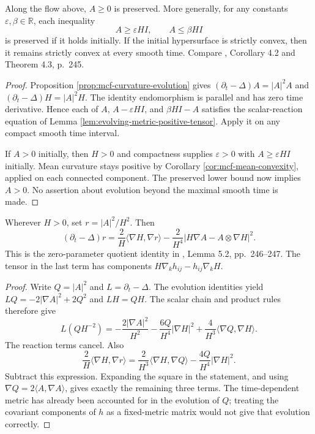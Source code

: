 \begin{proposition}\label{prop:mcf-linear-pinching}
Along the flow above, $A\geq0$ is preserved. More generally, for any constants $\varepsilon,\beta\in\mathbb R$, each inequality
\[
 A\geq\varepsilon H I,\qquad A\leq\beta H I
\]
is preserved if it holds initially. If the initial hypersurface is strictly convex, then it remains strictly convex at every smooth time. Compare \cite{Hui84}, Corollary 4.2 and Theorem 4.3, p.~245.
\end{proposition}
\begin{proof}
Proposition \ref{prop:mcf-curvature-evolution} gives
$(\partial_t-\Delta)A=|A|^2A$ and $(\partial_t-\Delta)H=|A|^2H$. The identity endomorphism is parallel and has zero time derivative. Hence each of $A$, $A-\varepsilon HI$, and $\beta HI-A$ satisfies the scalar-reaction equation of Lemma \ref{lem:evolving-metric-positive-tensor}. Apply it on any compact smooth time interval.

If $A>0$ initially, then $H>0$ and compactness supplies $\varepsilon>0$ with $A\geq\varepsilon HI$ initially. Mean curvature stays positive by Corollary \ref{cor:mcf-mean-convexity}, applied on each connected component. The preserved lower bound now implies $A>0$. No assertion about evolution beyond the maximal smooth time is made.
\end{proof}

\begin{proposition}\label{prop:mcf-curvature-ratio}
Wherever $H>0$, set $r=|A|^2/H^2$. Then
\[
 (\partial_t-\Delta)r
 =\frac2H\langle\nabla H,\nabla r\rangle
 -\frac{2}{H^4}|H\nabla A-A\otimes\nabla H|^2.
\]
This is the zero-parameter quotient identity in \cite{Hui84}, Lemma 5.2, pp.~246--247. The tensor in the last term has components $H\nabla_kh_{ij}-h_{ij}\nabla_kH$.
\end{proposition}
\begin{proof}
Write $Q=|A|^2$ and $L=\partial_t-\Delta$. The evolution identities yield $LQ=-2|\nabla A|^2+2Q^2$ and $LH=QH$. The scalar chain and product rules therefore give
\[
 L(QH^{-2})=-\frac{2|\nabla A|^2}{H^2}
 -\frac{6Q}{H^4}|\nabla H|^2
 +\frac4{H^3}\langle\nabla Q,\nabla H\rangle.
\]
The reaction terms cancel. Also
\[
 \frac2H\langle\nabla H,\nabla r\rangle
 =\frac2{H^3}\langle\nabla H,\nabla Q\rangle
 -\frac{4Q}{H^4}|\nabla H|^2.
\]
Subtract this expression. Expanding the square in the statement, and using $\nabla Q=2\langle A,\nabla A\rangle$, gives exactly the remaining three terms. The time-dependent metric has already been accounted for in the evolution of $Q$; treating the covariant components of $h$ as a fixed-metric matrix would not give that evolution correctly.
\end{proof}

